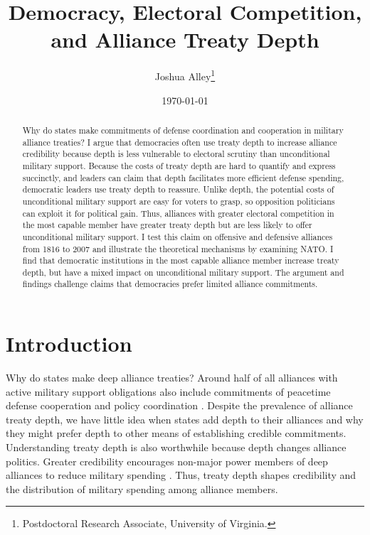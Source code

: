 \documentclass[12pt]{article}
\title{\textbf{Democracy, Electoral Competition, and Alliance Treaty Depth}}
\author{Joshua Alley\footnote{Postdoctoral Research Associate,
University of Virginia.}}
\date{\today}
\begin{document}
\maketitle 

\doublespace 

\begin{abstract}
Why do states make commitments of defense coordination and cooperation in military alliance treaties? 
I argue that democracies often use treaty depth to increase alliance credibility because depth is less vulnerable to electoral scrutiny than unconditional military support. 
Because the costs of treaty depth are hard to quantify and express succinctly, and leaders can claim that depth facilitates more efficient defense spending, democratic leaders use treaty depth to reassure. 
Unlike depth, the potential costs of unconditional military support are easy for voters to grasp, so opposition politicians can exploit it for political gain. 
Thus, alliances with greater electoral competition in the most capable member have greater treaty depth but are less likely to offer unconditional military support. 
I test this claim on offensive and defensive alliances from 1816 to 2007 and illustrate the theoretical mechanisms by examining NATO. 
I find that democratic institutions in the most capable alliance member increase treaty depth, but have a mixed impact on unconditional military support. 
The argument and findings challenge claims that democracies prefer limited alliance commitments. 
\end{abstract}


\newpage 


\section{Introduction}


Why do states make deep alliance treaties? 
Around half of all alliances with active military support obligations also include commitments of peacetime defense cooperation and policy coordination \citep{Leedsetal2002}. 
Despite the prevalence of alliance treaty depth, we have little idea when states add depth to their alliances and why they might prefer depth to other means of establishing credible commitments.
Understanding treaty depth is also worthwhile because depth changes alliance politics. 
Greater credibility encourages non-major power members of deep alliances to reduce military spending \citep{Alley2020}.  
Thus, treaty depth shapes credibility and the distribution of military spending among alliance members. 
\end{document}
